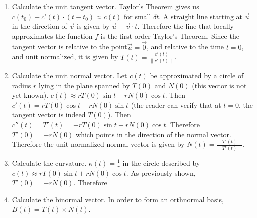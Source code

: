 \begin{enumerate}


\item Calculate the unit tangent vector. Taylor's Theorem gives us \(c(t_0) + c'(t) \cdot (t - t_0) \approx c(t)\) for small \(\delta t\). A straight line starting at \(\vec{u}\) in the direction of \(\vec{v}\) is given by \(\vec{u} + \vec{v} \cdot t\). Therefore the line that locally approximates the function \(f\) is the first-order Taylor's Theorem. Since the tangent vector is relative to the point\(\vec{u} = \vec{0}\), and relative to the time \(t = 0\), and unit normalized, it is given by \(T(t) = \frac{c'(t)}{\|c'(t)\|}\).

\item Calculate the unit normal vector. Let \(c(t)\) be approximated by a circle of radius \(r\) lying in the plane spanned by \(T(0)\) and \(N(0)\) (this vector is not yet known). \(c(t) \approx r T(0) \sin t + r N(0) \cos t\). Then \(c'(t) = r T(0) \cos t - r N(0) \sin t\) (the reader can verify that at \(t = 0\), the tangent vector is indeed \(T(0)\)). Then \(c''(t) = T'(t) = - r T(0) \sin t - r N(0) \cos t\). Therefore \(T'(0) = -rN(0)\) which points in the direction of the normal vector. Therefore the unit-normalized normal vector is given by \(N(t) = \frac{T'(t)}{\|T'(t)\|}\). %

\item Calculate the curvature. \(\kappa(t) = \frac{1}{r}\) in the circle described by \(c(t) \approx r T(0) \sin t + r N(0) \cos t\). As previously shown, \(T'(0) = -r N(0)\). Therefore

\item Calculate the binormal vector. In order to form an orthnormal basis, \(B(t) = T(t) \times N(t)\).

\end{enumerate}
